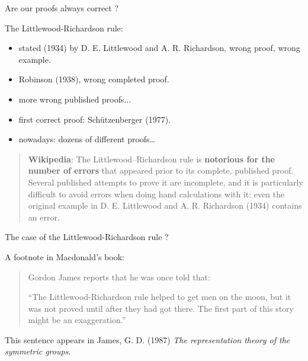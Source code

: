 \documentclass[compress,11pt]{beamer}
\newcommand{\red}[1]{{\color{red} #1}}
\begin{document}
\begin{frame}{Are our proofs always correct ?}

  The Littlewood-Richardson rule:

  \begin{itemize}
  \item stated (1934) by D. E. Littlewood and A. R. Richardson, \red{wrong
      proof, wrong example}.
  \item Robinson (1938), wrong completed proof.
  \item more wrong published proofs...
  \item first correct proof: Schützenberger (1977).
  \item nowadays: dozens of different proofs\dots
  \end{itemize}

  \begin{quotation}\small
    \textbf{Wikipedia}: The Littlewood–Richardson rule is \textbf{notorious
      for the number of errors} that appeared prior to its complete, published
    proof. Several published attempts to prove it are incomplete, and it is
    particularly difficult to avoid errors when doing hand calculations with
    it: even the original example in D. E. Littlewood and A. R. Richardson
    (1934) contains an error.
 \end{quotation}
\end{frame}


\begin{frame}{The case of the Littlewood-Richardson rule ?}

  A footnote in Macdonald's book:
  \medskip

  \begin{quotation}
    \noindent
    Gordon James reports that he was once told that:

    ``The Littlewood-Richardson rule helped to {\color{green} get men on the
      moon}, but it was {\color{red} not proved until after they had got
      there}. The first part of this story might be an exaggeration.''
  \end{quotation}
  \bigskip

  This sentence appears in James, G. D. (1987) \emph{The representation theory
    of the symmetric groups}.
\end{frame}
\end{document}
